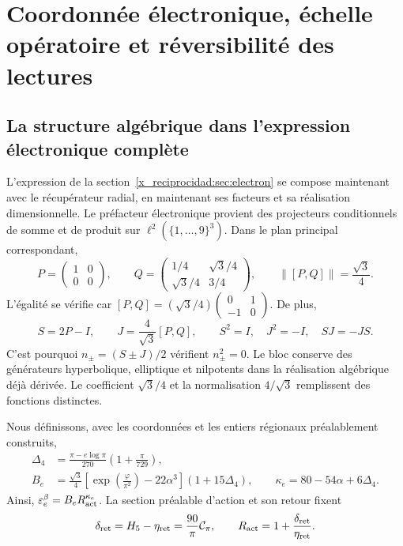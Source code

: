 \chapter{Coordonnée électronique, échelle opératoire et réversibilité des lectures}
\label{x_reciprocidad:rec:recuperacion}

\section{La structure algébrique dans l’expression électronique complète}

L’expression de la section~\ref{x_reciprocidad:sec:electron} se compose maintenant avec le récupérateur radial, en maintenant ses facteurs et sa réalisation dimensionnelle. Le préfacteur électronique provient des projecteurs conditionnels de somme et de produit sur \(\ell^2(\{1,\ldots,9\}^3)\). Dans le plan principal correspondant,
\[
 P=\begin{pmatrix}1&0\\0&0\end{pmatrix},\qquad
 Q=\begin{pmatrix}1/4&\sqrt3/4\\\sqrt3/4&3/4\end{pmatrix},
 \qquad\|[P,Q]\|=\frac{\sqrt3}{4}.
\]
L'égalité se vérifie car \([P,Q]=(\sqrt3/4)\left(\begin{smallmatrix}0&1\\-1&0\end{smallmatrix}\right)\).
De plus,
\[
 S=2P-I,\qquad J=\frac4{\sqrt3}[P,Q],\qquad
 S^2=I,\quad J^2=-I,\quad SJ=-JS.
\]
C’est pourquoi \(n_\pm=(S\pm J)/2\) vérifient \(n_\pm^2=0\). Le bloc conserve des générateurs hyperbolique, elliptique et nilpotents dans la réalisation algébrique déjà dérivée. Le coefficient \(\sqrt3/4\) et la normalisation \(4/\sqrt3\) remplissent des fonctions distinctes.

Nous définissons, avec les coordonnées et les entiers régionaux préalablement construits,
\begin{align}
 \Delta_4&=\frac{\pi-e\log\pi}{270}\left(1+\frac\pi{729}\right),\nonumber\\
 B_e&=\frac{\sqrt3}{4}
       \left[\exp\!\left(\frac\varphi{\pi^2}\right)-22\alpha^3\right]
       (1+15\Delta_4),\qquad
 \kappa_e=80-54\alpha+6\Delta_4.
 \label{x_reciprocidad:rec:eq:electron-basal}
\end{align}
Ainsi, \(\varepsilon_e^{\beta}=B_eR_{\rm act}^{\kappa_e}\). La section préalable d'action et son retour fixent
\[
 \delta_{\rm ret}=H_5-\eta_{\rm ret}=\frac{90}{\pi}\mathcal C_\pi,
 \qquad R_{\rm act}=1+\frac{\delta_{\rm ret}}{\eta_{\rm ret}}.
\]

